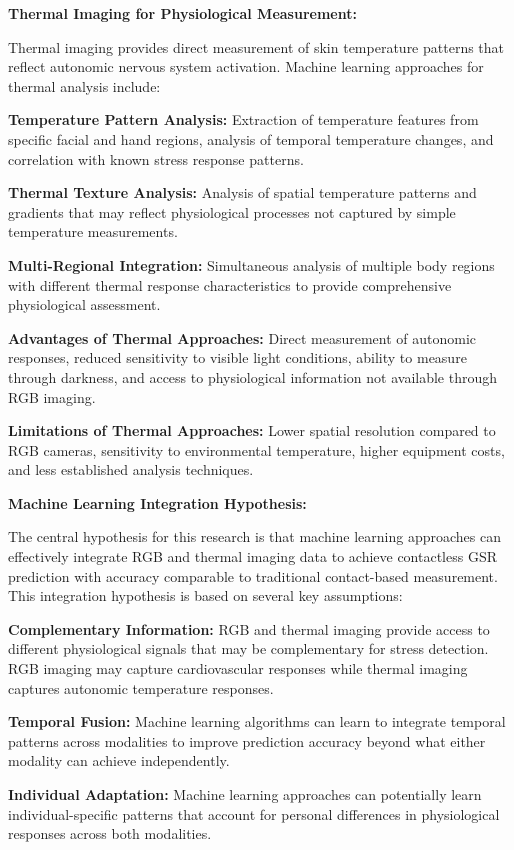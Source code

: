 \documentclass[12pt,a4paper]{report}
\begin{document}
\textbf{Thermal Imaging for Physiological Measurement:}

Thermal imaging provides direct measurement of skin temperature patterns that reflect autonomic nervous system
activation. Machine learning approaches for thermal analysis include:

\textbf{Temperature Pattern Analysis:} Extraction of temperature features from specific facial and hand regions, analysis of
temporal temperature changes, and correlation with known stress response patterns.

\textbf{Thermal Texture Analysis:} Analysis of spatial temperature patterns and gradients that may reflect physiological
processes not captured by simple temperature measurements.

\textbf{Multi-Regional Integration:} Simultaneous analysis of multiple body regions with different thermal response
characteristics to provide comprehensive physiological assessment.

\textbf{Advantages of Thermal Approaches:} Direct measurement of autonomic responses, reduced sensitivity to visible light
conditions, ability to measure through darkness, and access to physiological information not available through RGB
imaging.

\textbf{Limitations of Thermal Approaches:} Lower spatial resolution compared to RGB cameras, sensitivity to environmental
temperature, higher equipment costs, and less established analysis techniques.

\textbf{Machine Learning Integration Hypothesis:}

The central hypothesis for this research is that machine learning approaches can effectively integrate RGB and thermal
imaging data to achieve contactless GSR prediction with accuracy comparable to traditional contact-based measurement.
This integration hypothesis is based on several key assumptions:

\textbf{Complementary Information:} RGB and thermal imaging provide access to different physiological signals that may be
complementary for stress detection. RGB imaging may capture cardiovascular responses while thermal imaging captures
autonomic temperature responses.

\textbf{Temporal Fusion:} Machine learning algorithms can learn to integrate temporal patterns across modalities to improve
prediction accuracy beyond what either modality can achieve independently.

\textbf{Individual Adaptation:} Machine learning approaches can potentially learn individual-specific patterns that account
for personal differences in physiological responses across both modalities.
\end{document}
